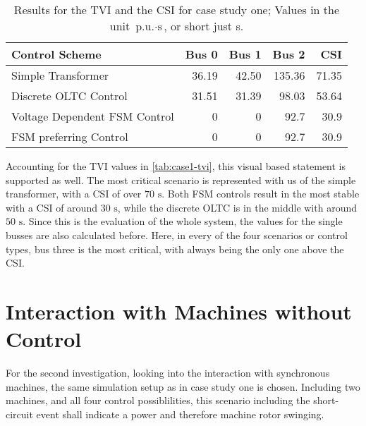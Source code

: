 \begin{table}[htbp!]
    \caption[Results for the \acs{TVI} and the \acs{CSI} for case study one]{Results for the \acs{TVI} and the \acs{CSI} for case study one; Values in the unit $\text{p.u.} \cdot \text{s}$, or short just s.}
    \label{tab:case1-tvi}
    \vspace*{12pt}
    \centering
    \small
    \begin{tabularx}{\textwidth}{Xrrrr}
        \textbf{Control Scheme} & \textbf{Bus 0} & \textbf{Bus 1} & \textbf{Bus 2} & \textbf{\acs{CSI}} \\ \hline
        \toprule
        Simple Transformer                  & 36.19 & 42.50 & 135.36 & 71.35 \\
        Discrete \acs{OLTC} Control         & 31.51 & 31.39 & 98.03 & 53.64 \\
        Voltage Dependent \acs{FSM} Control & 0 & 0 & 92.7 & 30.9 \\
        \acs{FSM} preferring Control        & 0 & 0 & 92.7 & 30.9 \\
        \bottomrule
    \end{tabularx}
\end{table}

Accounting for the \acs{TVI} values in \autoref{tab:case1-tvi}, this visual based statement is supported as well.
The most critical scenario is represented with us of the simple transformer, with a \acs{CSI} of over $70\text{ s}$.
Both \acs{FSM} controls result in the most stable with a \acs{CSI} of around $30\text{ s}$, while the discrete \acs{OLTC} is in the middle with around $50\text{ s}$.
Since this is the evaluation of the whole system, the values for the single busses are also calculated before.
Here, in every of the four scenarios or control types, bus three is the most critical, with always being the only one above the \acs{CSI}.

\section{Interaction with Machines without Control}
\label{case-2}

For the second investigation, looking into the interaction with synchronous machines, the same simulation setup as in case study one is chosen.
Including two machines, and all four control possiblilities, this scenario including the short-circuit event shall indicate a power and therefore machine rotor swinging.


